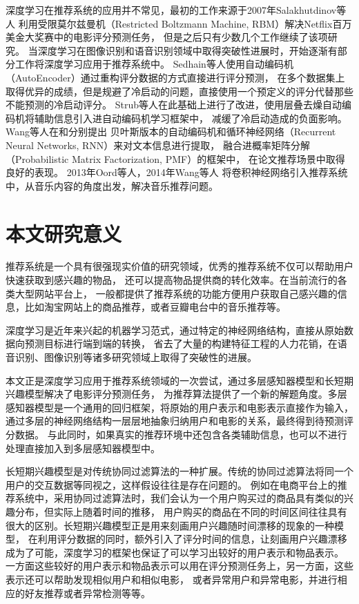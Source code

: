 深度学习在推荐系统的应用并不常见，最初的工作来源于2007年Salakhutdinov等人\parencite{salakhutdinov2007restricted}
利用受限莫尔兹曼机（Restricted Boltzmann Machine, RBM）解决Netflix百万美金大奖赛中的电影评分预测任务，
但是之后只有少数几个工作\parencite{phung2009ordinal}继续了该项研究。
当深度学习在图像识别和语音识别领域中取得突破性进展时，开始逐渐有部分工作将深度学习应用于推荐系统中。
Sedhain等人\parencite{sedhain2015autorec}使用自动编码机（AutoEncoder）通过重构评分数据的方式直接进行评分预测，
在多个数据集上取得优异的成绩，但是规避了冷启动的问题，直接使用一个预定义的评分代替那些不能预测的冷启动评分。
Strub等人\parencite{strub2016hybrid}在此基础上进行了改进，使用层叠去燥自动编码机将辅助信息引入进自动编码机学习框架中，
减缓了冷启动造成的负面影响。
Wang等人在\parencite{wang2015collaborative}和\parencite{wang2016collaborative}分别提出
贝叶斯版本的自动编码机和循环神经网络（Recurrent Neural Networks, RNN）来对文本信息进行提取，
融合进概率矩阵分解（Probabilistic Matrix Factorization, PMF）\parencite{salakhutdinov2007probabilistic}的框架中，
在论文推荐场景中取得良好的表现。
2013年Oord等人\parencite{van2013deep}，2014年Wang等人\parencite{wang2014improving}
将卷积神经网络引入推荐系统中，从音乐内容的角度出发，解决音乐推荐问题。

\section{本文研究意义}
推荐系统是一个具有很强现实价值的研究领域，优秀的推荐系统不仅可以帮助用户快速获取到感兴趣的物品，
还可以提高物品提供商的转化效率。在当前流行的各类大型网站平台上，
一般都提供了推荐系统的功能方便用户获取自己感兴趣的信息，比如淘宝网站上的商品推荐，或者豆瓣电台中的音乐推荐等。

深度学习是近年来兴起的机器学习范式，通过特定的神经网络结构，直接从原始数据向预测目标进行端到端的转换，
省去了大量的构建特征工程的人力花销，在语音识别、图像识别等诸多研究领域上取得了突破性的进展。

本文正是深度学习应用于推荐系统领域的一次尝试，通过多层感知器模型和长短期兴趣模型解决了电影评分预测任务，
为推荐算法提供了一个新的解题角度。多层感知器模型是一个通用的回归框架，将原始的用户表示和电影表示直接作为输入，
通过多层的神经网络结构一层层地抽象归纳用户和电影的关系，最终得到待预测评分数据。
与此同时，如果真实的推荐环境中还包含各类辅助信息，也可以不进行处理直接加入到多层感知器模型中。

长短期兴趣模型是对传统协同过滤算法的一种扩展。传统的协同过滤算法将同一个用户的交互数据等同视之，这样假设往往是存在问题的。
例如在电商平台上的推荐系统中，采用协同过滤算法时，我们会认为一个用户购买过的商品具有类似的兴趣分布，但实际上随着时间的推移，
用户购买的商品在不同的时间区间往往具有很大的区别。长短期兴趣模型正是用来刻画用户兴趣随时间漂移的现象的一种模型，
在利用评分数据的同时，额外引入了评分时间的信息，让刻画用户兴趣漂移成为了可能，深度学习的框架也保证了可以学习出较好的用户表示和物品表示。
一方面这些较好的用户表示和物品表示可以用在评分预测任务上，另一方面，这些表示还可以帮助发现相似用户和相似电影，
或者异常用户和异常电影，并进行相应的好友推荐或者异常检测等等。

